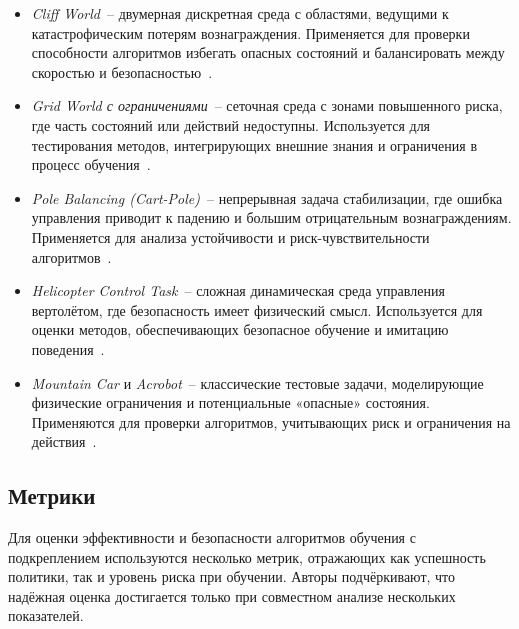 \begin{itemize}

    \item \emph{Cliff World}~-- двумерная дискретная среда с областями, ведущими к катастрофическим потерям вознаграждения.  
    Применяется для проверки способности алгоритмов избегать опасных состояний и балансировать между скоростью и безопасностью~\cite{gaskett2003}.

    \item \emph{Grid World с ограничениями}~-- сеточная среда с зонами повышенного риска, где часть состояний или действий недоступны.  
    Используется для тестирования методов, интегрирующих внешние знания и ограничения в процесс обучения~\cite{driessens2004}.

    \item \emph{Pole Balancing (Cart-Pole)}~-- непрерывная задача стабилизации, где ошибка управления приводит к падению и большим отрицательным вознаграждениям.  
    Применяется для анализа устойчивости и риск-чувствительности алгоритмов~\cite{geibel2005}.

    \item \emph{Helicopter Control Task}~-- сложная динамическая среда управления вертолётом, где безопасность имеет физический смысл.  
    Используется для оценки методов, обеспечивающих безопасное обучение и имитацию поведения~\cite{abbeel2005, abbeel2010}.

    \item \emph{Mountain Car} и \emph{Acrobot}~-- классические тестовые задачи, моделирующие физические ограничения и потенциальные «опасные» состояния.  
    Применяются для проверки алгоритмов, учитывающих риск и ограничения на действия~\cite{mihatsch2002, moldovan2012}.

\end{itemize}


\subsection{Метрики}

Для оценки эффективности и безопасности алгоритмов обучения с подкреплением используются несколько метрик, отражающих как успешность политики, так и уровень риска при обучении.  
Авторы подчёркивают, что надёжная оценка достигается только при совместном анализе нескольких показателей.

